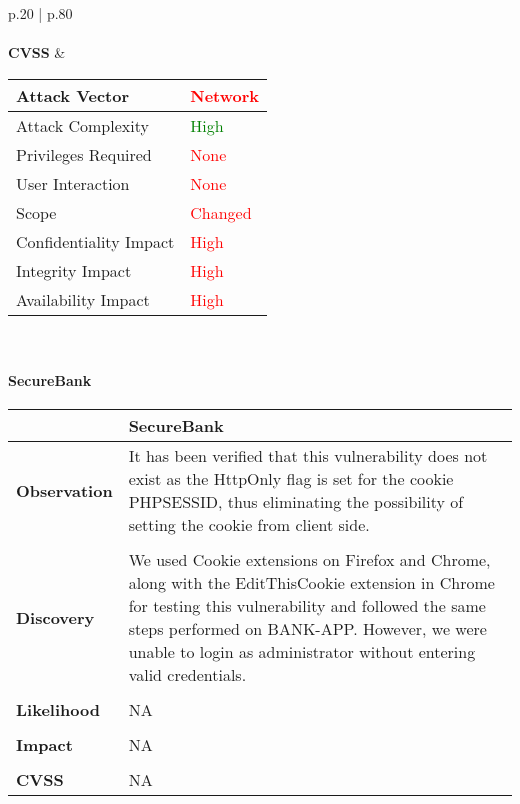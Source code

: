 \begin{longtable*}{p{.20\textwidth} | p{.80\textwidth}}
    \\\\
    \textbf{CVSS} &
      \begin{tabular}{| l | l |}
      \hline
      Attack Vector		& \textcolor{red}{Network}\\
      \hline
      Attack Complexity	& \textcolor{Green}{High} \\
      \hline
      Privileges Required & \textcolor{red}{None} \\
      \hline
      User Interaction	& \textcolor{red}{None} \\
      \hline
      Scope		& \textcolor{red}{Changed} \\
      \hline
      Confidentiality Impact	& \textcolor{red}{High} \\
      \hline
      Integrity Impact		& \textcolor{red}{High} \\
      \hline
      Availability Impact		& \textcolor{red}{High} \\
      \hline
      \end{tabular}
    \\
    \hline
\end{longtable*}
\paragraph{SecureBank} \mbox{}
\begin{longtable*}{p{.20\textwidth} | p{.80\textwidth}}
    \hline
    & \textbf{SecureBank} \\
    \hline
    \textbf{Observation} &
       It has been verified that this vulnerability does not exist as the HttpOnly flag is set for the cookie PHPSESSID, thus eliminating the possibility of setting the cookie from client side.
    \\\\
    \textbf{Discovery} &
    We used Cookie extensions on Firefox and Chrome, along with the EditThisCookie extension in Chrome for testing this vulnerability and followed the same steps performed on BANK-APP. However, we were unable to login as administrator without entering valid credentials.
    \\\\
    \textbf{Likelihood} &
        NA
    \\\\
    \textbf{Impact} &
        NA
    \\\\
    \textbf{CVSS} &
        NA
    \\
    \hline
\end{longtable*}
\clearpage